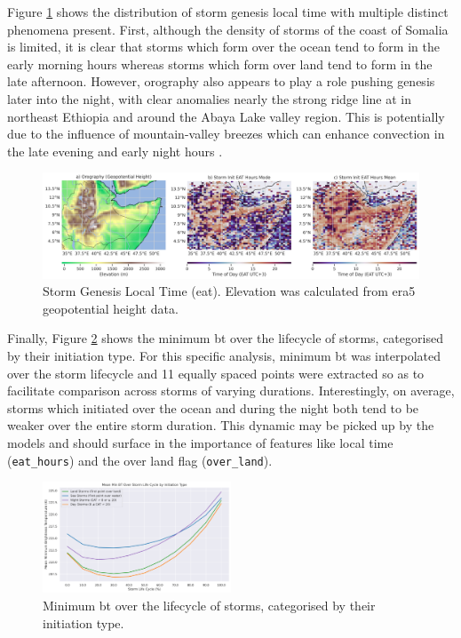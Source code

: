 Figure \ref{fig:orography_storm_init_eat_hours_mode_mean} shows the distribution of storm genesis local time with multiple distinct phenomena present. First, although the density of storms of the coast of Somalia is limited, it is clear that storms which form over the ocean tend to form in the early morning hours whereas storms which form over land tend to form in the late afternoon. However, orography also appears to play a role pushing genesis later into the night, with clear anomalies nearly the strong ridge line at  in northeast Ethiopia and around the Abaya Lake valley region. This is potentially due to the influence of mountain-valley breezes which can enhance convection in the late evening and early night hours \citep{ZardiDinoandWhiteman2013}.

\begin{figure}[ht]
    \centering
    \includegraphics[width=\textwidth]{../figures/generated/exploration/orography_storm_init_eat_hours_mode_mean.png}
    \caption{Storm Genesis Local Time (\acrlong{eat}). Elevation was calculated from \acrshort{era5} geopotential height data.}
    \label{fig:orography_storm_init_eat_hours_mode_mean}
\end{figure}

Finally, Figure \ref{fig:min_bt_over_lifecycle_by_init_type} shows the minimum \acrshort{bt} over the lifecycle of storms, categorised by their initiation type. For this specific analysis, minimum \acrshort{bt} was interpolated over the storm lifecycle and 11 equally spaced points were extracted so as to facilitate comparison across storms of varying durations. Interestingly, on average, storms which initiated over the ocean and during the night both tend to be weaker over the entire storm duration. This dynamic may be picked up by the models and should surface in the importance of features like local time (\texttt{eat\_hours}) and the over land flag (\texttt{over\_land}). 

\begin{figure}[ht]
    \centering
    \includegraphics[width=0.5\textwidth]{../figures/generated/exploration/min_bt_over_lifecycle_by_init_type.png}
    \caption{Minimum \acrfull{bt} over the lifecycle of storms, categorised by their initiation type.}
    \label{fig:min_bt_over_lifecycle_by_init_type}
\end{figure}

